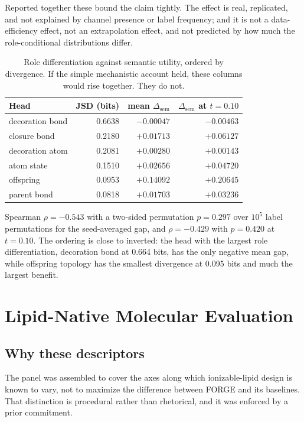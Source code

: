 \documentclass{article}
\newcommand{\Dsem}{\ensuremath{\Delta_{\mathrm{sem}}}}
\begin{document}
Reported together these bound the claim tightly. The effect is real, replicated, and not explained by
channel presence or label frequency; and it is not a data-efficiency effect, not an extrapolation
effect, and not predicted by how much the role-conditional distributions differ.
\begin{table}[h]
\centering
\caption{Role differentiation against semantic utility, ordered by divergence. If the simple
mechanistic account held, these columns would rise together. They do not.}
\label{tab:divergence}
\small
\begin{tabular}{@{}lrrr@{}}
\toprule
Head & JSD (bits) & mean $\Dsem$ & $\Dsem$ at $t=0.10$ \\
\midrule
decoration bond  & 0.6638 & $-0.00047$ & $-0.00463$ \\
closure bond     & 0.2180 & $+0.01713$ & $+0.06127$ \\
decoration atom  & 0.2081 & $+0.00280$ & $+0.00143$ \\
atom state       & 0.1510 & $+0.02656$ & $+0.04720$ \\
offspring        & 0.0953 & $+0.14092$ & $+0.20645$ \\
parent bond      & 0.0818 & $+0.01703$ & $+0.03236$ \\
\bottomrule
\end{tabular}
\end{table}

Spearman $\rho = -0.543$ with a two-sided permutation $p = 0.297$ over $10^5$ label permutations for
the seed-averaged gap, and $\rho = -0.429$ with $p = 0.420$ at $t = 0.10$. The ordering is close to
inverted: the head with the largest role differentiation, decoration bond at 0.664 bits, has the only
negative mean gap, while offspring topology has the smallest divergence at 0.095 bits and much the
largest benefit.

\section{Lipid-Native Molecular Evaluation}
\label{app:lipid_metrics}

\subsection{Why these descriptors}
\label{app:why-descriptors}
The panel was assembled to cover the axes along which ionizable-lipid design is known to vary, not
to maximize the difference between FORGE and its baselines. That distinction is procedural rather than
rhetorical, and it was enforced by a prior commitment.
\end{document}
